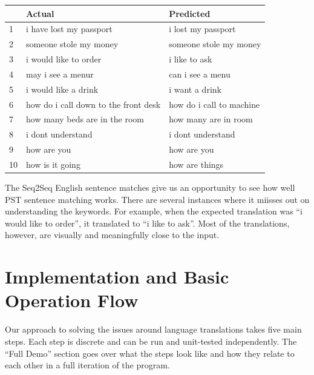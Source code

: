 \documentclass[runningheads]{llncs}
\begin{document}
	\begin{table} 
		\begin{center}
			\begin{tabular}{| l | l | l | |}			
				\hline
				 & Actual \ & Predicted  \\
				 \hline
					1 & i have lost my passport & i lost my passport \\
				    \hline				
					2 & someone stole my money & someone stole my money \\
					\hline
					3 & i would like to order & i like to ask \\
					\hline
					4 & may i see a menur & can i see a menu \\
					\hline
					5 & i would like a drink & i want a drink   \\
					\hline
					6 & how do i call down to the front desk & how do i call to machine    \\
					\hline
				    7 & how many beds are in the room & how many are  in  room       \\
				    \hline
					8 & i dont understand & i dont understand   \\
					\hline
					9 & how are you &  how are you  \\
					\hline
					10 & how is it going & how are things    \\
				\hline
			\end{tabular}
		\end{center}
		\label{table:English Sentence Matches}
	\end{table}

	The Seq2Seq English sentence matches give us an opportunity to see how well PST sentence matching works. There are several instances where it miisses out on understanding the keywords. For example, when the expected translation was “i would like to order”, it translated to “i like to ask”. Most of the translations, however, are visually and meaningfully close to the input.
	
	\section{Implementation and Basic Operation Flow}
	Our approach to solving the issues around language translations takes five main steps. Each step is discrete and can be run and unit-tested independently. The ``Full Demo'' section goes over what the steps look like and how they relate to each other in a full iteration of the program. 
\end{document}
